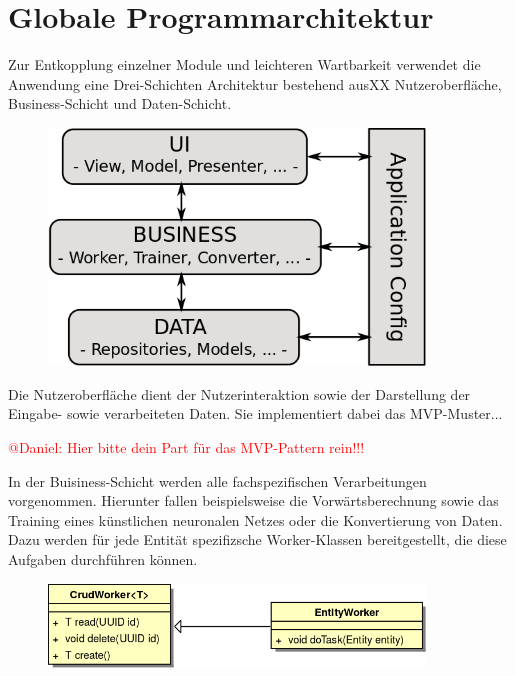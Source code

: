 \section{Globale Programmarchitektur}

Zur Entkopplung einzelner Module und leichteren Wartbarkeit verwendet die Anwendung eine Drei-Schichten Architektur bestehend ausXX	 Nutzeroberfläche, Business-Schicht und Daten-Schicht. 
\begin{figure}[H]
\begin{center}
\includegraphics[width=10cm]{Abbildungen/UML/jan/SchichtenModell.png}
\end{center}
\end{figure}
Die Nutzeroberfläche dient der Nutzerinteraktion sowie der Darstellung der Eingabe- sowie verarbeiteten Daten. Sie implementiert dabei das MVP-Muster...

\textcolor{red}{ @Daniel: Hier bitte dein Part für das MVP-Pattern rein!!!}


In der Buisiness-Schicht werden alle fachspezifischen Verarbeitungen vorgenommen. Hierunter fallen beispielsweise die Vorwärtsberechnung sowie das Training eines künstlichen neuronalen Netzes oder die Konvertierung von Daten. Dazu werden für jede Entität spezifizsche Worker-Klassen bereitgestellt, die diese Aufgaben durchführen können.

\begin{figure}[H]
\begin{center}
\includegraphics[width=10cm]{Abbildungen/UML/jan/workerClassDiagramm.png}
\end{center}
\end{figure}

